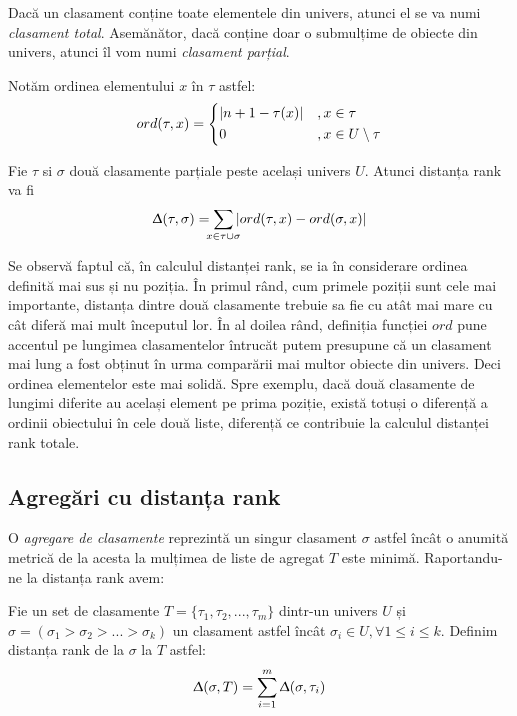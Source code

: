 Dacă un clasament conține toate elementele din univers, atunci el se va numi 
\textit{clasament total}. Asemănător, dacă conține doar o submulțime de obiecte din univers, atunci
îl vom numi \textit{clasament parțial}.

Notăm ordinea elementului $x$ în $\tau$ astfel:
\begin{gather}
\label{ord}
  ord(\tau, x)= \begin{dcases}
    |n + 1 - \tau(x)|    &, x \in \tau \\
    0                    &, x \in U \setminus \tau
  \end{dcases}
\end{gather}

\begin{definition}
Fie $\tau$ si $\sigma$ două clasamente parțiale peste același univers $U$. Atunci distanța rank va fi
\begin{gather}
  \Updelta(\tau, \sigma) = \smashoperator{\sum_{x \in \tau \cup \sigma}} |ord(\tau, x) - ord(\sigma, x)|
\end{gather}
\end{definition}

Se observă faptul că, în calculul distanței rank, se ia în considerare ordinea definită mai sus
și nu poziția. În primul rând, cum primele poziții sunt cele mai importante, distanța dintre două
clasamente trebuie sa fie cu atât mai mare cu cât diferă mai mult începutul lor.\cite{linguisticstructuresmarcus}
În al doilea rând, definiția funcției $ord$ pune accentul pe lungimea clasamentelor întrucăt putem
presupune că un clasament mai lung a fost obținut în urma comparării mai multor obiecte din univers.
Deci ordinea elementelor este mai solidă. Spre exemplu, dacă două clasamente de lungimi diferite au
același element pe prima poziție, există totuși o diferență a ordinii obiectului în cele două liste,
diferență ce contribuie la calculul distanței rank totale.\cite{rankaggregationproblem}

\subsection{Agregări cu distanța rank}
O \textit{agregare de clasamente} reprezintă un singur clasament $\sigma$ astfel încât o anumită 
metrică de la acesta la mulțimea de liste de agregat $T$ este minimă. Raportandu-ne la distanța
rank avem\cite{rankdistance}:

\begin{definition}
Fie un set de clasamente $T = \{\tau_1, \tau_2, ..., \tau_m\}$ dintr-un univers $U$ și
$\sigma = (\sigma_1 > \sigma_2 > ... > \sigma_k)$ un clasament astfel încât $\sigma_i \in U, 
\forall 1 \leqslant i \leqslant k$. Definim distanța rank de la $\sigma$ la $T$ astfel:
\begin{gather}
  \Updelta(\sigma, T) = \smashoperator{\sum_{i = 1}^{m}} \Updelta(\sigma, \tau_i)
\end{gather}
\end{definition}

